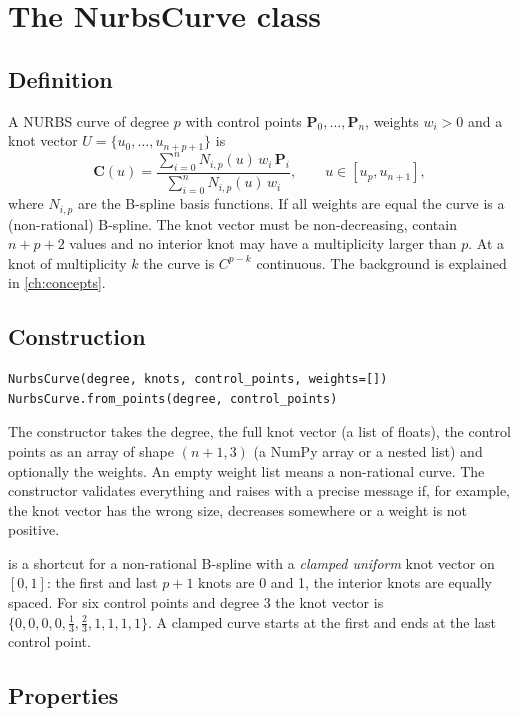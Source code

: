 \section{The NurbsCurve class}\label{sec:nurbscurve}

\subsection{Definition}

A NURBS curve of degree $p$ with control points $\mathbf P_0,\dots,\mathbf P_n$, weights
$w_i > 0$ and a knot vector $U = \{u_0, \dots, u_{n+p+1}\}$ is
\[
  \mathbf C(u) = \frac{\sum_{i=0}^{n} N_{i,p}(u)\, w_i\, \mathbf P_i}
                      {\sum_{i=0}^{n} N_{i,p}(u)\, w_i},
  \qquad u \in [u_p, u_{n+1}],
\]
where $N_{i,p}$ are the B-spline basis functions. If all weights are equal the curve is a
(non-rational) B-spline. The knot vector must be non-decreasing, contain $n + p + 2$ values and
no interior knot may have a multiplicity larger than $p$. At a knot of multiplicity $k$ the curve
is $C^{p-k}$ continuous. The background is explained in \cref{ch:concepts}.

\subsection{Construction}

\begin{lstlisting}[style=text]
NurbsCurve(degree, knots, control_points, weights=[])
NurbsCurve.from_points(degree, control_points)
\end{lstlisting}

The constructor takes the degree, the full knot vector (a list of floats), the control points as
an array of shape $(n+1, 3)$ (a NumPy array or a nested list) and optionally the weights. An empty
weight list means a non-rational curve. The constructor validates everything and raises
 with a precise message if, for example, the knot vector has the wrong size,
decreases somewhere or a weight is not positive.

 is a shortcut for a non-rational B-spline with a \emph{clamped
uniform} knot vector on $[0,1]$: the first and last $p+1$ knots are 0 and 1, the interior knots
are equally spaced. For six control points and degree 3 the knot vector is
$\{0,0,0,0,\tfrac13,\tfrac23,1,1,1,1\}$. A clamped curve starts at the first and ends at the last
control point.

\subsection{Properties}


